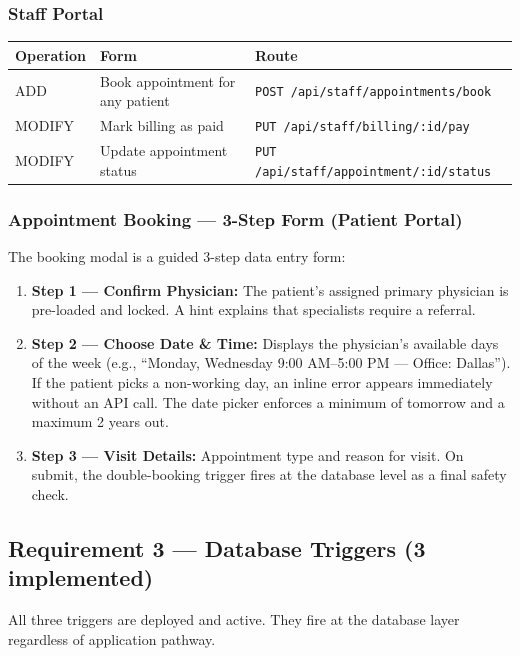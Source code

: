 \documentclass[12pt, letterpaper]{article}
\begin{document}
\subsubsection{Staff Portal}
\begin{center}
\begin{tabular}{lll}
  \toprule
  \textbf{Operation} & \textbf{Form} & \textbf{Route} \\
  \midrule
  ADD    & Book appointment for any patient & \texttt{POST /api/staff/appointments/book} \\
  MODIFY & Mark billing as paid            & \texttt{PUT /api/staff/billing/:id/pay} \\
  MODIFY & Update appointment status       & \texttt{PUT /api/staff/appointment/:id/status} \\
  \bottomrule
\end{tabular}
\end{center}

\subsubsection{Appointment Booking — 3-Step Form (Patient Portal)}
The booking modal is a guided 3-step data entry form:
\begin{enumerate}
  \item \textbf{Step 1 — Confirm Physician:} The patient's assigned primary physician is pre-loaded and locked. A hint explains that specialists require a referral.
  \item \textbf{Step 2 — Choose Date \& Time:} Displays the physician's available days of the week (e.g., ``Monday, Wednesday 9:00 AM–5:00 PM — Office: Dallas''). If the patient picks a non-working day, an inline error appears immediately without an API call. The date picker enforces a minimum of tomorrow and a maximum 2 years out.
  \item \textbf{Step 3 — Visit Details:} Appointment type and reason for visit. On submit, the double-booking trigger fires at the database level as a final safety check.
\end{enumerate}

\subsection{Requirement 3 — Database Triggers (3 implemented)}

\begin{greenbox}
All three triggers are deployed and active. They fire at the database layer regardless of application pathway.
\end{greenbox}
\end{document}
